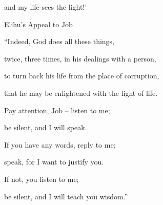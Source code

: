 {\par }{\Q and my life
sees
the light!’
\par }{\SH Elihu’s Appeal to Job
\par }{\Q {}“Indeed,
God
does
all
these
things,
\par }{\Q twice,
three
times, in his dealings with
a person,
\par }{\Q {}to turn back
his life
from
the place of corruption,
\par }{\Q that he may be enlightened
with the light
of life.
\par }{\Q {}Pay attention,
Job
– listen
to me;
\par }{\Q be silent,
and I
will speak.
\par }{\Q {}If
you have
any words,
reply
to me;
\par }{\Q speak,
for
I want
to justify you.
\par }{\Q {}If
not,
you
listen
to me;
\par }{\Q be silent,
and I will teach
you wisdom.”

\par }

